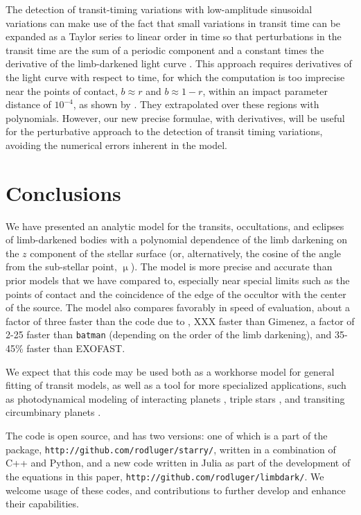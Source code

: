 \documentclass[modern]{aastex61}
\begin{document}
The detection of transit-timing variations with low-amplitude sinusoidal
variations can make use of the fact that small variations in transit time
can be expanded as a Taylor series to linear order in time so that perturbations
in the transit time are the sum of a periodic component and a constant
times the derivative of the limb-darkened light curve \citep{Ofir2018}.
This approach requires derivatives of the light curve with respect to
time, for which the \citet{MandelAgol2002} computation is too
imprecise near the points of contact, $b \approx r$ and $b \approx 1-r$,
within an impact parameter distance of $10^{-4}$, as shown by \citet{Ofir2018}.
They extrapolated over these regions with polynomials.
However, our new precise formulae, with derivatives, will be useful
for the perturbative approach to the detection of transit timing
variations, avoiding the numerical errors inherent in the \citet{MandelAgol2002}
model.

\section{Conclusions}

We have presented an analytic model for the transits, occultations, and
eclipses of limb-darkened bodies with a polynomial dependence of the limb darkening
on the $z$ component of the stellar surface (or, alternatively, the
cosine of the angle from the sub-stellar point, $\upmu$).  The model is more precise
and accurate than prior models that we have compared to, especially near
special limits such as the points of contact and the coincidence of the edge
of the occultor with the center of the source.  The model also compares favorably in
speed of evaluation, about a factor of three faster than the code due
to \citet{Pal2008}, XXX faster than Gimenez, a factor of 2-25 faster than \texttt{batman}
(depending on the order of the limb darkening), and 35-45\% faster than EXOFAST.

We expect that this code may be used both as a workhorse model for
general fitting of transit models, as well as a tool for more
specialized applications, such as photodynamical modeling of
interacting planets \citep{Carter2012}, triple stars \citep{Carter2011}, and 
transiting circumbinary planets \citep{Doyle2011}.

The code is open source, and has two versions:  one of which is a part
of the \starry package, \texttt{http://github.com/rodluger/starry/}, written
in a combination of C++ and Python, and a new code written in Julia as
part of the development of the equations in this paper,
\texttt{http://github.com/rodluger/limbdark/}.  We welcome usage of these
codes, and contributions to further develop and enhance their capabilities.
\end{document}
